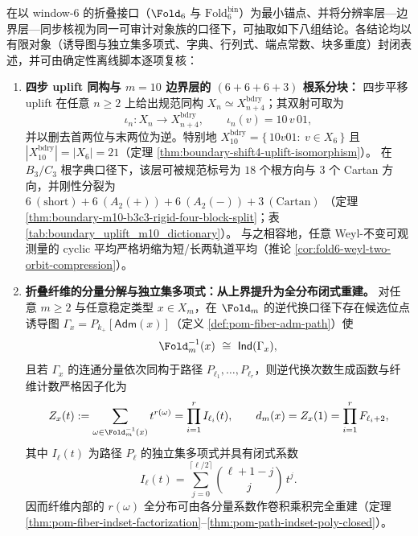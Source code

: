 \begin{theorem}\label{thm:window6-unified-skeleton}
在以 window-\(6\) 的折叠接口（\(\Fold_6\) 与 \(\mathrm{Fold}^{\mathrm{bin}}_6\)）为最小锚点、并将分辨率层—边界层—同步核视为同一可审计对象族的口径下，可抽取如下八组结论。各结论均以有限对象（诱导图与独立集多项式、字典、行列式、端点常数、块多重度）封闭表述，并可由确定性离线脚本逐项复核：
\begin{enumerate}
  \item \textbf{四步 uplift 同构与 \(m=10\) 边界层的 \texorpdfstring{$(6+6+6+3)$}{(6+6+6+3)} 根系分块：}
  四步平移 uplift 在任意 \(n\ge 2\) 上给出规范同构 \(X_n\simeq X_{n+4}^{\mathrm{bdry}}\)；其双射可取为
  \[
  \iota_n:X_n\to X_{n+4}^{\mathrm{bdry}},
  \qquad
  \iota_n(v)=10\,v\,01,
  \]
  并以删去首两位与末两位为逆。特别地
  \(
  X_{10}^{\mathrm{bdry}}=\{\,10v01:\ v\in X_6\,\}
  \)
  且 \(|X_{10}^{\mathrm{bdry}}|=|X_6|=21\)（定理 \ref{thm:boundary-shift4-uplift-isomorphism}）。
  在 \(B_3/C_3\) 根字典口径下，该层可被规范标号为 \(18\) 个根方向与 \(3\) 个 Cartan 方向，并刚性分裂为
  \(
  6\ (\mathrm{short})+6\ (A_2(+))+6\ (A_2(-))+3\ (\mathrm{Cartan})
  \)
  （定理 \ref{thm:boundary-m10-b3c3-rigid-four-block-split}；表 \ref{tab:boundary_uplift_m10_dictionary}）。
  与之相容地，任意 Weyl-不变可观测量的 cyclic 平均严格坍缩为短/长两轨道平均（推论 \ref{cor:fold6-weyl-two-orbit-compression}）。

  \item \textbf{折叠纤维的分量分解与独立集多项式：从上界提升为全分布闭式重建。}
  对任意 \(m\ge 2\) 与任意稳定类型 \(x\in X_m\)，在 \(\Fold_m\) 的逆代换口径下存在候选位点诱导图 \(\Gamma_x=P_{k_+}[\mathsf{Adm}(x)]\)（定义 \ref{def:pom-fiber-adm-path}）使
  \[
  \Fold_m^{-1}(x)\ \cong\ \mathsf{Ind}(\Gamma_x),
  \]
  且若 \(\Gamma_x\) 的连通分量依次同构于路径 \(P_{\ell_1},\dots,P_{\ell_r}\)，则逆代换次数生成函数与纤维计数严格因子化为
  \[
  Z_x(t):=\sum_{\omega\in\Fold_m^{-1}(x)}t^{r(\omega)}
  =\prod_{i=1}^r I_{\ell_i}(t),
  \qquad
  d_m(x)=Z_x(1)=\prod_{i=1}^r F_{\ell_i+2},
  \]
  其中 \(I_{\ell}(t)\) 为路径 \(P_\ell\) 的独立集多项式并具有闭式系数
  \[
  I_{\ell}(t)=\sum_{j=0}^{\lceil \ell/2\rceil}\binom{\ell+1-j}{j}\,t^j.
  \]
  因而纤维内部的 \(r(\omega)\) 全分布可由各分量系数作卷积乘积完全重建（定理 \ref{thm:pom-fiber-indset-factorization}--\ref{thm:pom-path-indset-poly-closed}）。


\end{enumerate}
\end{theorem}
